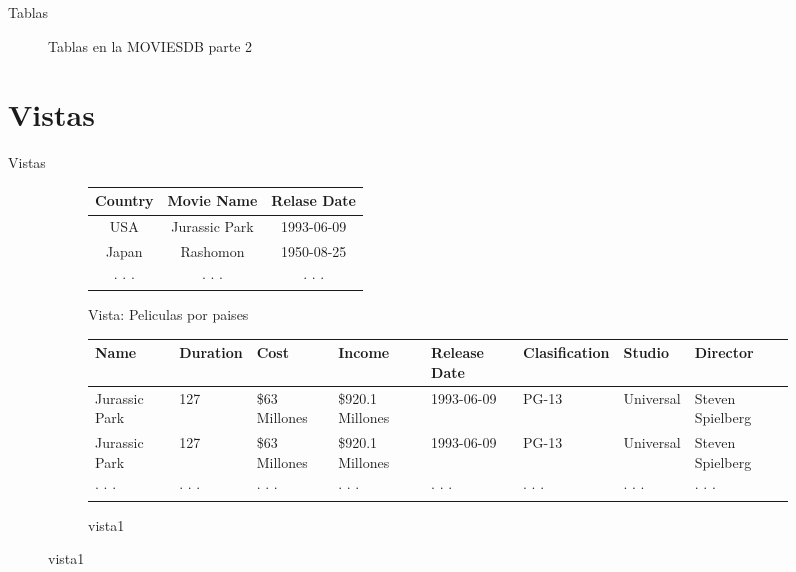\documentclass{beamer}%
\begin{document}
\begin{frame}{Tablas}
\begin{figure}
\begin{subfigure}[b]{0.3\textwidth}
    \end{subfigure}
    \caption{Tablas en la MOVIESDB parte 2}
\end{figure}
\end{frame}

\section{Vistas}
\begin{frame}{Vistas}
	\begin{figure}

		\begin{subfigure}[b]{1\textwidth}
			\begin{tabular}{|c|c|c|}\hline
				Country		&		Movie Name		&		Relase Date \\ \hline
				USA			&		Jurassic Park	&		1993-06-09	\\	\hline
				Japan		&		Rashomon		&		1950-08-25	\\	\hline
				$\cdot$ $\cdot$ $\cdot$		&	$\cdot$ $\cdot$ $\cdot$		& $\cdot$ $\cdot$ $\cdot$ \\ \hline
			\end{tabular}
			\caption{Vista: Peliculas por paises}
		\end{subfigure}
		
		\begin{subfigure}[b]{1\textwidth}
		\begin{scriptsize}
			\begin{tabular}{|p{0.1\textwidth}|p{}|p{}|p{}|p{}|p{}|p{}|p{}|}\hline


	Name	&	Duration	&	Cost	&	Income	&	Release Date	&	Clasification	&	Studio	&	Director	\\ \hline
Jurassic Park & 127 & \$63 Millones & \$920.1 Millones & 1993-06-09 &	PG-13 & Universal & Steven Spielberg\\ \hline
Jurassic Park & 127 & \$63 Millones & \$920.1 Millones & 1993-06-09 &	PG-13 & Universal & Steven Spielberg\\ \hline
$\cdot$ $\cdot$ $\cdot$		&	$\cdot$ $\cdot$ $\cdot$		& $\cdot$ $\cdot$ $\cdot$  &$\cdot$ $\cdot$ $\cdot$		&	$\cdot$ $\cdot$ $\cdot$		& $\cdot$ $\cdot$ $\cdot$ &$\cdot$ $\cdot$ $\cdot$		&	$\cdot$ $\cdot$ $\cdot$	\\ \hline
			\end{tabular}
		\end{scriptsize}
			\caption{vista1}
		\end{subfigure}		
	\end{figure}
	
\end{frame}
\end{document}
